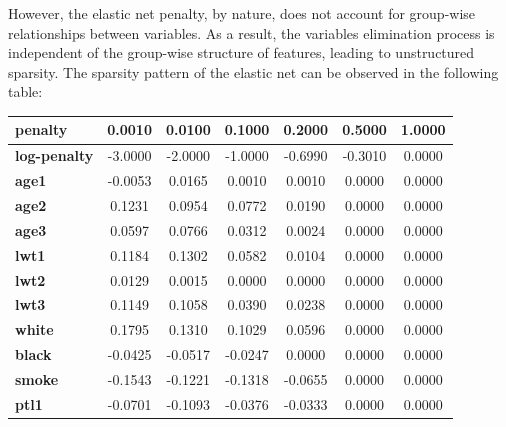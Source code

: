 \documentclass[a4paper,12pt]{article}
\begin{document}
        \noindent However, the elastic net penalty, by nature, does not account for group-wise relationships between variables. As a result, the variables elimination process is independent of the group-wise structure of features, leading to unstructured sparsity. The sparsity pattern of the elastic net can be observed in the following table:\\
\begin{table}[H]
\centering
\begin{tabular}{|l|c|c|c|c|c|c|}
\hline
\textbf{penalty}     & \textbf{0.0010} & \textbf{0.0100} & \textbf{0.1000} & \textbf{0.2000} & \textbf{0.5000} & \textbf{1.0000} \\ \hline
\textbf{log-penalty} & -3.0000         & -2.0000         & -1.0000         & -0.6990         & -0.3010         & 0.0000          \\ \hline
\textbf{age1}        & -0.0053         & 0.0165          & 0.0010          & 0.0010          & 0.0000          & 0.0000          \\ \hline
\textbf{age2}        & 0.1231          & 0.0954          & 0.0772          & 0.0190          & 0.0000          & 0.0000          \\ \hline
\textbf{age3}        & 0.0597          & 0.0766          & 0.0312          & 0.0024          & 0.0000          & 0.0000          \\ \hline
\textbf{lwt1}        & 0.1184          & 0.1302          & 0.0582          & 0.0104          & 0.0000          & 0.0000          \\ \hline
\textbf{lwt2}        & 0.0129          & 0.0015          & 0.0000          & 0.0000          & 0.0000          & 0.0000          \\ \hline
\textbf{lwt3}        & 0.1149          & 0.1058          & 0.0390          & 0.0238          & 0.0000          & 0.0000          \\ \hline
\textbf{white}       & 0.1795          & 0.1310          & 0.1029          & 0.0596          & 0.0000          & 0.0000          \\ \hline
\textbf{black}       & -0.0425         & -0.0517         & -0.0247         & 0.0000          & 0.0000          & 0.0000          \\ \hline
\textbf{smoke}       & -0.1543         & -0.1221         & -0.1318         & -0.0655         & 0.0000          & 0.0000          \\ \hline
\textbf{ptl1}        & -0.0701         & -0.1093         & -0.0376         & -0.0333         & 0.0000          & 0.0000          \\ \hline

\end{tabular}
\end{table}
\end{document}
